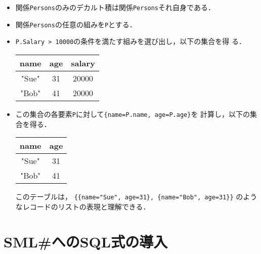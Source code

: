 \documentclass{jbook}
\newcommand{\smlsharp}{SML\#}
\begin{document}
\begin{itemize}
\item 関係{\tt Persons}のみのデカルト積は関係{\tt Persons}それ自身である．
\item 関係{\tt Persons}の任意の組みを{\tt P}とする．
\item {\tt P.Salary > 10000}の条件を満たす組みを選び出し，以下の集合を得
る．

\begin{center}
\begin{tabular}{|c|c|c|}
\hline
name & age & salary
\\\hline
"Sue" & 31 & 20000
\\\hline
"Bob" & 41 & 20000
\\\hline
\end{tabular}
\end{center}
\item この集合の各要素{\tt P}に対して{\tt \{name=P.name, age=P.age\}}を
計算し，以下の集合を得る．

\begin{center}
\begin{tabular}{|c|c|}
\hline
name & age
\\\hline
"Sue" & 31
\\\hline
"Bob" & 41
\\\hline
\end{tabular}
\end{center}
このテーブルは，
{\tt \{\{name="Sue", age=31\}, \{name="Bob", age=31\}\}}
のようなレコードのリストの表現と理解できる．
\end{itemize}

\section{\smlsharp{}へのSQL式の導入}
\label{sec:tutorialIntoroducingSQL}
\end{document}
